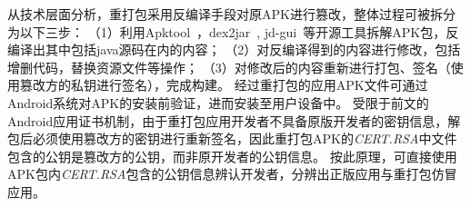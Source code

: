 从技术层面分析，重打包采用反编译手段对原APK进行篡改，整体过程可被拆分为以下三步：
（1）利用Apktool~\cite{apktool}，dex2jar~\cite{dex2jar}, jd-gui~\cite{jd-gui}等开源工具拆解APK包，反编译出其中包括java源码在内的内容；
（2）对反编译得到的内容进行修改，包括增删代码，替换资源文件等操作；
（3）对修改后的内容重新进行打包、签名（使用篡改方的私钥进行签名），完成构建。
经过重打包的应用APK文件可通过Android系统对APK的安装前验证，进而安装至用户设备中。
受限于前文的Android应用证书机制，由于重打包应用开发者不具备原版开发者的密钥信息，解包后必须使用篡改方的密钥进行重新签名，因此重打包APK的\textit{CERT.RSA}中文件包含的公钥是篡改方的公钥，而非原开发者的公钥信息。
按此原理，可直接使用APK包内\textit{CERT.RSA}包含的公钥信息辨认开发者，分辨出正版应用与重打包仿冒应用。






